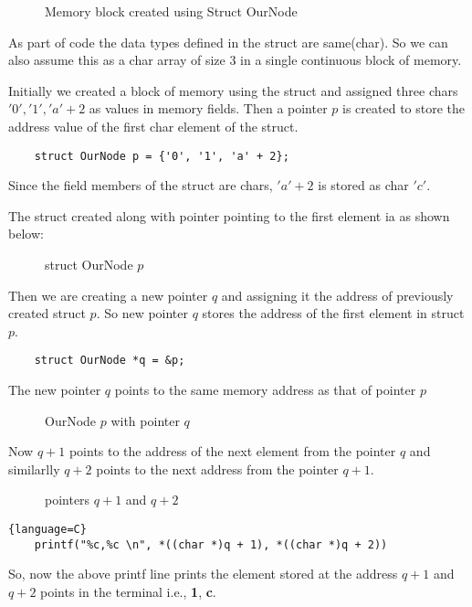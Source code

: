 \documentclass[journal,12pt,twocolumn]{IEEEtran}
\begin{document}
\begin{figure}[!ht]
    \begin{center}
        \resizebox{\columnwidth}{!}{}
    \end{center}
    \caption{Memory block created using Struct OurNode}
    \label{fig:ee18btech11046_memeory}
\end{figure}


As part of code the data types defined in the struct are same(char). So we can also assume this
as a char array of size 3 in a single continuous block of memory.

Initially we created a block of memory  using the struct and assigned
three chars $'0','1','a'+2$ as values in memory fields. Then a pointer $p$ is created to
store the address value of the first char element of the struct.
\begin{lstlisting}
    struct OurNode p = {'0', '1', 'a' + 2};
\end{lstlisting}

Since the field members of the struct are chars, $'a'+2$ is stored as char $'c'$.

The struct created along with pointer pointing to the first element ia as shown below:
\begin{figure}[!ht]
    \begin{center}
        \resizebox{\columnwidth}{!}{}
    \end{center}
    \caption{struct OurNode $p$}
    \label{fig:ee18btech11046_memeory2}
\end{figure}


Then we are creating a new pointer $q$ and assigning it the address of previously created struct $p$.
So new pointer $q$ stores the address of the first element in struct $p$.
\begin{lstlisting}
    struct OurNode *q = &p;
\end{lstlisting}
The new pointer $q$ points to the same memory address as that of pointer $p$
\begin{figure}[!ht]
    \begin{center}
        \resizebox{\columnwidth}{!}{}
    \end{center}
    \caption{OurNode $p$ with pointer $q$}
    \label{fig:ee18btech11046_memeory3}
\end{figure}

Now $q+1$ points to the address of the next element from the pointer $q$ and similarlly
$q+2$ points to the next address from the pointer $q+1$.
\begin{figure}[!ht]
    \begin{center}
        \resizebox{\columnwidth}{!}{}
    \end{center}
    \caption{pointers $q+1$ and $q+2$}
    \label{fig:ee18btech11046_memeory4}
\end{figure}

\begin{lstlisting}{language=C}
    printf("%c,%c \n", *((char *)q + 1), *((char *)q + 2))
    \end{lstlisting}

So, now the above printf line prints the element stored at the address $q+1$ and $q+2$ points
in the terminal i.e., \textbf{1}, \textbf{c}.
\end{document}
